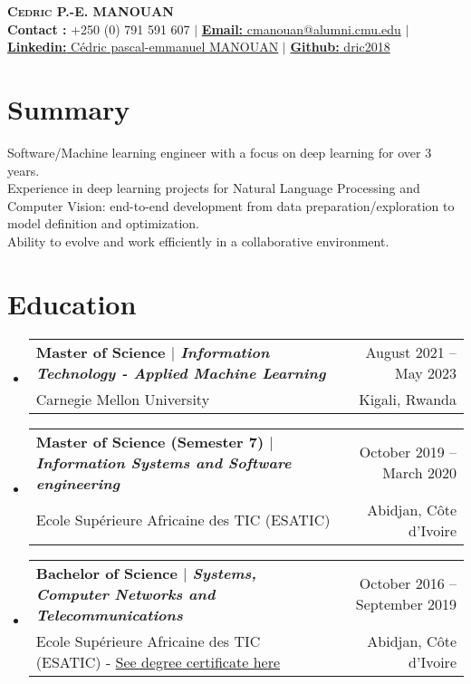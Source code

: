 \documentclass[A4,11pt]{article}
\makeatletter
\newcommand{\CVSubheading}[4]{
  \vspace{-2pt}\item
    \begin{tabular*}{0.97\textwidth}[t]{l@{\extracolsep{\fill}}r}
      \textbf{#1} & #2 \\
      \small#3 & \small #4 \\
    \end{tabular*}\vspace{-7pt}
}
\newcommand{\CVSubHeadingListStart}{\begin{itemize}[leftmargin=0.5cm, label={}]}
\newcommand{\CVSubHeadingListEnd}{\end{itemize}}
\makeatother
\begin{document}
\begin{center}
  \textbf{\LARGE \scshape Cedric P.-E. MANOUAN} \\ \vspace{1pt} %
  \small{\textbf{Contact : }+250 (0) 791 591 607} $|$
  \href{mailto:cmanouan@alumni.cmu.edu}{\textbf{Email:} cmanouan@alumni.cmu.edu} $|$ \\
  \href{https://www.linkedin.com/in/cpem/} {\textbf{Linkedin:} Cédric pascal-emmanuel MANOUAN} $|$ 
  \href{https://github.com/dric2018/}{\textbf{Github:} dric2018}\\

\end{center}

\section{Summary}

Software/Machine learning engineer with a focus on deep learning for over 3 years. \\%
Experience in deep learning projects for Natural Language Processing and Computer Vision: end-to-end development from data preparation/exploration to model definition and optimization.
\\Ability to evolve and work efficiently in a collaborative environment. %


\section{Education}
\CVSubHeadingListStart
\CVSubheading
{{Master of Science $|$ \emph{\small{Information Technology - Applied Machine Learning}}}}{August 2021 -- May 2023}
{Carnegie Mellon University}{Kigali, Rwanda}
\CVSubheading
{{Master of Science (Semester 7) $|$ \emph{\small{Information Systems and Software engineering}}}}{October 2019 -- March 2020}
{Ecole Supérieure Africaine des TIC (ESATIC) }{Abidjan, Côte d'Ivoire}
\CVSubheading
{Bachelor of Science $|$ \emph{\small{Systems, Computer Networks and Telecommunications}}}{October 2016 -- September 2019}
{Ecole Supérieure Africaine des TIC (ESATIC) - \href{https://drive.google.com/file/d/1AHcLovrqVw6Awh7r_sUYj2X1VdPfAZGq/view?usp=sharing}{See degree certificate here}}{Abidjan, Côte d'Ivoire}
\CVSubHeadingListEnd
\end{document}
